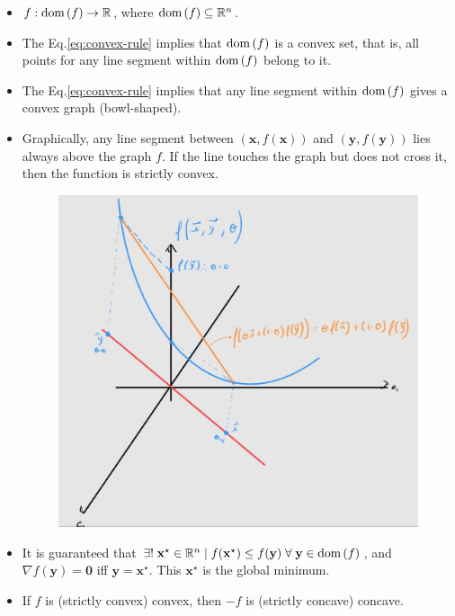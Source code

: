 \documentclass{article}
\newcommand{\dom}[1]{\ensuremath{\textnormal{dom}\left(#1\right)}} %
\begin{document}
\begin{itemize}
    \item \(f: \dom{f} \rightarrow \mathbb{R}\), where \(\dom{f} \subseteq \mathbb{R}^{n}\).
    \item The Eq.\eqref{eq:convex-rule} implies that \(\dom{f}\) is a convex set, that is, all points for any line segment within \(\dom{f}\) belong to it.
    \item The Eq.\eqref{eq:convex-rule} implies that any line segment within \(\dom{f}\) gives a convex graph (bowl-shaped).
    \item Graphically, any line segment between \((\mathbf{x}, f(\mathbf{x}))\) and \((\mathbf{y}, f(\mathbf{y}))\) lies always above the graph \(f\). If the line touches the graph but does not cross it, then the function is strictly convex.
    \begin{figure}[H]
        \centering
        \includegraphics[scale=.2]{figs/convex.png}
    \end{figure}
    \item It is guaranteed that \(\exists!\; \mathbf{x}^{\star} \in \mathbb{R}^{n} \mid f(\mathbf{x}^{\star}) \leq f(\mathbf{y})\;\forall\;\mathbf{y}\in\dom{f}\), and \(\nabla f(\mathbf{y}) = \mathbf{0}\) iff \(\mathbf{y} = \mathbf{x}^{\star}\). This \(\mathbf{x}^{\star}\) is the global minimum.
    \item If \(f\) is (strictly convex) convex, then \(-f\) is (strictly concave) concave.
\end{itemize}
\end{document}
